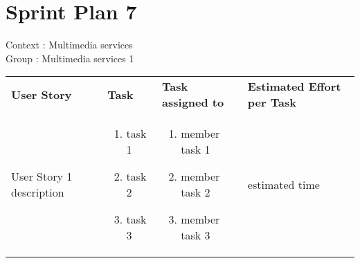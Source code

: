 \documentclass[11pt,a4paper]{article}
\begin{document}
\section*{Sprint Plan 7}
Context : Multimedia services\\
Group : Multimedia services 1\\



\begin{table}[h]
\begin{tabular}{|p{6cm}|p{5.5cm}|p{4cm}|p{3cm}|}
\textbf{User Story} & \textbf{Task} & \textbf{Task assigned to} & \textbf{Estimated Effort per Task} \\
User Story 1 description & \begin{enumerate}
\item task 1
\item task 2
\item task 3
\end{enumerate}

& 
\begin{enumerate}
\item member task 1
\item member task 2
\item member task 3
\end{enumerate}

& 
estimated time \\

           
\end{tabular}
\end{table}
\end{document}
